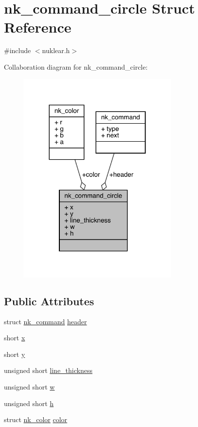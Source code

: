 \hypertarget{structnk__command__circle}{}\section{nk\+\_\+command\+\_\+circle Struct Reference}
\label{structnk__command__circle}


{\ttfamily \#include $<$nuklear.\+h$>$}



Collaboration diagram for nk\+\_\+command\+\_\+circle\+:
\nopagebreak
\begin{figure}[H]
\begin{center}
\leavevmode
\includegraphics[width=228pt]{structnk__command__circle__coll__graph}
\end{center}
\end{figure}
\subsection*{Public Attributes}
\begin{DoxyCompactItemize}
\item 
struct \mbox{\hyperlink{structnk__command}{nk\+\_\+command}} \mbox{\hyperlink{structnk__command__circle_a30307deb035c1dccf43c849fd04a11f7}{header}}
\item 
short \mbox{\hyperlink{structnk__command__circle_a31305a7d86f24c473a1368822582d856}{x}}
\item 
short \mbox{\hyperlink{structnk__command__circle_adbeef71bac7e533fe09e059a9c1969e4}{y}}
\item 
unsigned short \mbox{\hyperlink{structnk__command__circle_a116b0d9a26840d54000e63dbcf0829ac}{line\+\_\+thickness}}
\item 
unsigned short \mbox{\hyperlink{structnk__command__circle_a07238a686ed308b4d1802a35b587eb0d}{w}}
\item 
unsigned short \mbox{\hyperlink{structnk__command__circle_a88c469119d31c7e7ea9c0b10814db875}{h}}
\item 
struct \mbox{\hyperlink{structnk__color}{nk\+\_\+color}} \mbox{\hyperlink{structnk__command__circle_aa9f19465515260dc83e60cab859cb040}{color}}
\end{DoxyCompactItemize}


